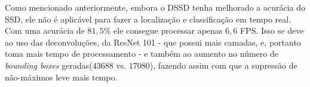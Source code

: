 Como mencionado anteriormente, embora o \ac{DSSD} tenha melhorado a acurácia do \ac{SSD}, ele não é aplicável para fazer a localização e classificação em tempo real. Com uma acurácia de $81,5\%$ ele consegue processar apenas $6,6$ \ac{FPS}. Isso se deve ao uso das deconvoluções, da ResNet 101 - que possui mais camadas, e, portanto toma mais tempo de processamento - e também ao aumento no número de \textit{bounding boxes} geradas($43688$ vs. $17080$), fazendo assim com que a supressão de não-máximos leve mais tempo.